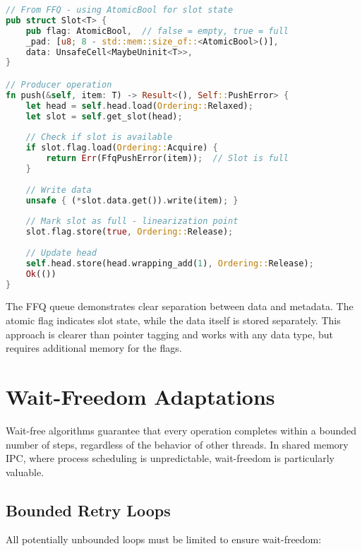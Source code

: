 \begin{lstlisting}[language=Rust, style=boxed, caption={Atomic boolean flags for state tracking}, label={lst:atomic-flags}]
// From FFQ - using AtomicBool for slot state
pub struct Slot<T> {
    pub flag: AtomicBool,  // false = empty, true = full
    _pad: [u8; 8 - std::mem::size_of::<AtomicBool>()],
    data: UnsafeCell<MaybeUninit<T>>,
}

// Producer operation
fn push(&self, item: T) -> Result<(), Self::PushError> {
    let head = self.head.load(Ordering::Relaxed);
    let slot = self.get_slot(head);
    
    // Check if slot is available
    if slot.flag.load(Ordering::Acquire) {
        return Err(FfqPushError(item));  // Slot is full
    }
    
    // Write data
    unsafe { (*slot.data.get()).write(item); }
    
    // Mark slot as full - linearization point
    slot.flag.store(true, Ordering::Release);
    
    // Update head
    self.head.store(head.wrapping_add(1), Ordering::Release);
    Ok(())
}
\end{lstlisting}

The FFQ queue demonstrates clear separation between data and metadata. The atomic flag indicates slot state, while the data itself is stored separately. This approach is clearer than pointer tagging and works with any data type, but requires additional memory for the flags.

\section{Wait-Freedom Adaptations}

Wait-free algorithms guarantee that every operation completes within a bounded number of steps, regardless of the behavior of other threads. In shared memory IPC, where process scheduling is unpredictable, wait-freedom is particularly valuable.

\subsection{Bounded Retry Loops}

All potentially unbounded loops must be limited to ensure wait-freedom:

